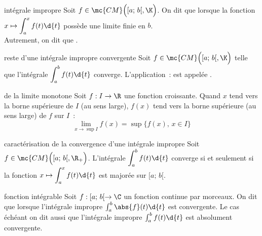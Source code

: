 

\begin{adjustwidth}{-3cm}{-3cm}


\newcommand{\intsemi}[0]{[a;\,b[}
\newcommand{\cm}{\mc{CM}\Big([a;\,b[,\K\Big)}
\newcommand{\cmplus}{\mc{CM}\Big([a;\,b[,\R_+\Big)}

\begin{definition}{12.1}{intégrale impropre}
    Soit $f \in \cm$. On dit que  lorsque la fonction $\displaystyle x \mapsto \int_a^x f(t) \d{t}$ possède une limite finie en $b$.\\
    Autrement, on dit que .
\end{definition}

\begin{definition}{12.5}{reste d'une intégrale impropre convergente}
    Soit $f \in \cm$ telle que l'intégrale $\displaystyle \int_{a}^{b}f(t)\d{t}$ converge. L'application~:
    \fonction{R}{\intsemi}{\K}{x}{\int_{x}^{b}f(t)\d{t}}
    est appelée .
\end{definition}

\begin{theoreme}{12.6}{de la limite monotone}
    Soit $f:I\to \R$ une fonction croissante. Quand $x$ tend vers la borne supérieure de $I$ (au sens large), $f(x)$ tend vers la borne supérieure (au sens large) de $f$ sur $I$~:
    $$\lim_{x \to \sup I} f(x) = \sup\{f(x),\, x \in I\}$$
\end{theoreme}

\begin{proposition}{12.8}{caractérisation de la convergence d'une intégrale impropre}
    Soit $f \in \cmplus$. L'intégrale $ \displaystyle \int_a^bf(t)\d{t}$ converge si et seulement si la fonction $\displaystyle x \mapsto \int_a^x f(t)\d{t}$ est majorée sur $\intsemi$.
\end{proposition}

\begin{definition}{12.14}{fonction intégrable}
    Soit $f:\intsemi \to \C$ un fonction continue par morceaux. On dit que  lorsque l'intégrale impropre $\int_a^b \abs{f}(t)\d{t}$ est convergente. Le cas échéant on dit aussi que l'intégrale impropre $\int_a^b f(t) \d{t}$ est absolument convergente.
\end{definition}


\end{adjustwidth}
